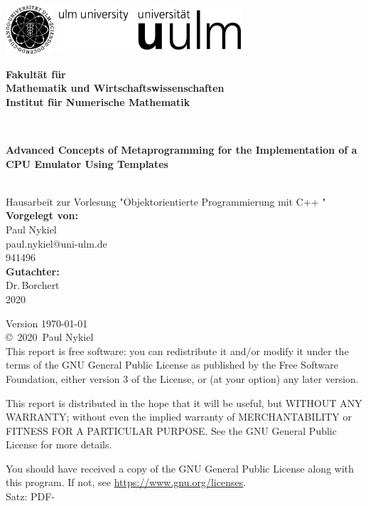 \documentclass[a4paper,12pt,
headsepline,           %
oneside,               %
pointlessnumbers,      %
bibtotoc,              %
DIV=15,               %
BCOR15mm               %
]{scrartcl}
\makeatletter
\newcommand{\fullname}{Paul Nykiel}
\newcommand{\email}{paul.nykiel@uni-ulm.de}
\newcommand{\titel}{Advanced Concepts of Metaprogramming for the Implementation of a CPU Emulator Using Templates}
\newcommand{\jahr}{2020}
\newcommand{\matnr}{941496}
\newcommand{\gutachter}{Dr.\,Borchert}
\newcommand{\fakultaet}{Mathematik und Wirtschaftswissenschaften}
\newcommand{\institut}{Institut für Numerische Mathematik}
\makeatother
\begin{document}
\thispagestyle{empty}
\begin{addmargin*}[4mm]{-10mm}

\includegraphics[height=1.8cm]{images/unilogo_bild}
\hfill
\includegraphics[height=1.8cm]{images/unilogo_wort}\\[1em]

{\footnotesize
\hspace*{115mm}\parbox[t]{35mm}{\bfseries Fakultät für\\
\fakultaet\\
\mdseries \institut}\\[2cm]

\parbox{140mm}{\bfseries \LARGE \titel}\\[2.5em]
{\footnotesize Hausarbeit zur Vorlesung "Objektorientierte Programmierung mit C++
"}\\[3em]

{\footnotesize \bfseries Vorgelegt von:}\\
{\footnotesize \fullname\\ \email}\\ \matnr\\[2em]
{\footnotesize \bfseries Gutachter:}\\                     
{\footnotesize \gutachter}\\[2em]
{\footnotesize \jahr}
}
\end{addmargin*}


\clearpage
\thispagestyle{empty}
{ \small
  \flushleft
  Version \today \\\vfill
  \copyright~\jahr~\fullname\\[0.5em]

This report is free software: you can redistribute it and/or modify
it under the terms of the GNU General Public License as published by
the Free Software Foundation, either version 3 of the License, or
(at your option) any later version.

This report is distributed in the hope that it will be useful,
but WITHOUT ANY WARRANTY; without even the implied warranty of
MERCHANTABILITY or FITNESS FOR A PARTICULAR PURPOSE.  See the
GNU General Public License for more details.

You should have received a copy of the GNU General Public License
along with this program.  If not, see \href{https://www.gnu.org/licenses}{https://www.gnu.org/licenses}.\\

  Satz: PDF-\LaTeXe
}
\end{document}
